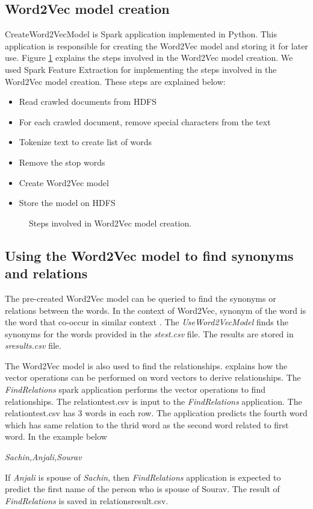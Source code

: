 \subsection{Word2Vec model creation} \label{createmodelsection}
CreateWord2VecModel is Spark application implemented in Python. This
application is responsible for creating the Word2Vec model and storing it for
 later use. Figure \ref{fig:word2vecmodelflow} explains the steps involved in
  the Word2Vec model creation. We used Spark Feature Extraction
  \cite{www-sparkml-features} for implementing the steps involved in the
  Word2Vec model creation. These steps are explained below:
  \begin{itemize}
  \item Read crawled documents from HDFS
  \item For each crawled document, remove special characters from the text
  \item Tokenize text to create list of words
  \item Remove the stop words
  \item Create Word2Vec model
  \item Store the model on HDFS
  \end{itemize}

\begin{figure}[htbp]
\centering
{}
\caption{Steps involved in Word2Vec model creation.}
\label{fig:word2vecmodelflow}
\end{figure}

\subsection{Using the Word2Vec model to find synonyms and relations}
\label{usemodel}

The pre-created Word2Vec model can be queried to find the synonyms or
relations between the words. In the context of Word2Vec, synonym of the word
is the word that co-occur in similar context \cite{Goldberg2014word2vecED}.
The \textit{UseWord2VecModel} finds the synonyms for the words provided in
 the
\textit{stest.csv} file. The results are stored in \textit{sresults.csv} file.

The Word2Vec model is also used to find the relationships.
\cite{www-tensorflow} explains how the vector operations can be performed on
word vectors to derive relationships. The \textit{FindRelations} spark
application
performs the vector operations to find relationships. The relationtest.csv is
 input to the \textit{FindRelations} application. The relationtest.csv has 3
  words in
  each row. The application predicts the fourth word which has same relation to
  the thrid word as the second word related to first word. In the example below

   \textit{Sachin,Anjali,Sourav}

If \textit{Anjali} is spouse of \textit{Sachin}, then \textit{FindRelations}
application is
expected to
 predict the first name of the person who is spouse of Sourav.
  The result of \textit{FindRelations} is saved in relationsresult.csv.



